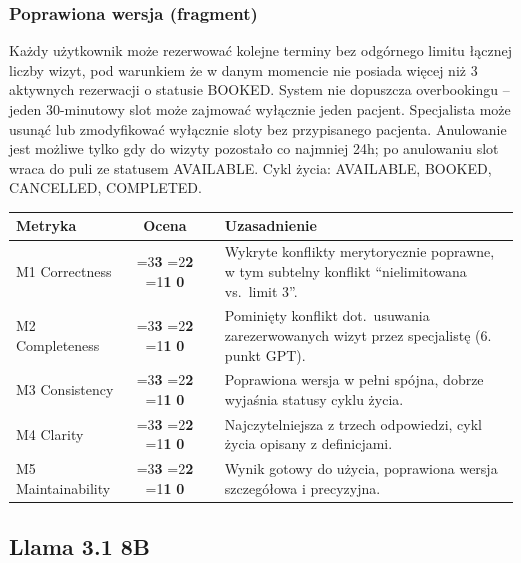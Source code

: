 \documentclass[12pt,a4paper]{article}
\newcommand{\scorebox}[1]{%
  \ifnum#1=3\colorbox{score3}{\textbf{3}}%
  \else\ifnum#1=2\colorbox{score2}{\textbf{2}}%
  \else\ifnum#1=1\colorbox{score1}{\textbf{1}}%
  \else\colorbox{score0}{\textbf{0}}\fi\fi\fi
}
\begin{document}
\subsubsection{Poprawiona wersja (fragment)}
\small
Każdy użytkownik może rezerwować kolejne terminy bez odgórnego limitu łącznej liczby wizyt, pod warunkiem że w danym momencie nie posiada więcej niż 3 aktywnych rezerwacji o statusie BOOKED. System nie dopuszcza overbookingu -- jeden 30-minutowy slot może zajmować wyłącznie jeden pacjent. Specjalista może usunąć lub zmodyfikować wyłącznie sloty bez przypisanego pacjenta. Anulowanie jest możliwe tylko gdy do wizyty pozostało co najmniej 24h; po anulowaniu slot wraca do puli ze statusem AVAILABLE. Cykl życia: AVAILABLE, BOOKED, CANCELLED, COMPLETED.
\normalsize

\vspace{0.5em}
\begin{tabular}{lccl}
\toprule
\textbf{Metryka} & \textbf{Ocena} & & \textbf{Uzasadnienie} \\
\midrule
M1 Correctness    & \scorebox{3} && Wykryte konflikty merytorycznie poprawne, w tym subtelny konflikt ``nielimitowana vs.\ limit 3''. \\
M2 Completeness   & \scorebox{2} && Pominięty konflikt dot.\ usuwania zarezerwowanych wizyt przez specjalistę (6. punkt GPT). \\
M3 Consistency    & \scorebox{3} && Poprawiona wersja w pełni spójna, dobrze wyjaśnia statusy cyklu życia. \\
M4 Clarity        & \scorebox{3} && Najczytelniejsza z trzech odpowiedzi, cykl życia opisany z definicjami. \\
M5 Maintainability & \scorebox{3} && Wynik gotowy do użycia, poprawiona wersja szczegółowa i precyzyjna. \\
\bottomrule
\end{tabular}

\vspace{1.5em}

\subsection{\textcolor{llamacolor}{Llama 3.1 8B} }
\end{document}

